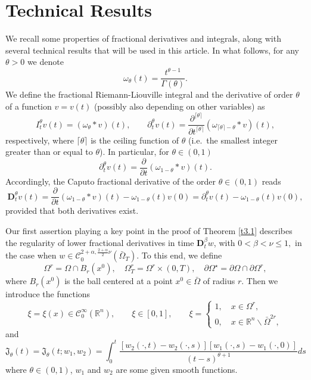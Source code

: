 \documentclass[reqno]{amsart}
\def\R {\mathbb{R}}
\def\C {\mathcal{C}}
\theoremstyle{definition}
\numberwithin{equation}{section}
\begin{document}
\section{Technical Results}
\label{s4}

\noindent
We recall some properties of fractional derivatives and integrals,
along with several technical results that will be used in this article.
In what follows, for any $\theta>0$ we denote
\begin{equation*}\label{4.1}
\omega_{\theta}(t)=\frac{t^{\theta-1}}{\Gamma(\theta)}.
\end{equation*}
We define the fractional Riemann-Liouville integral and the derivative of order $\theta$ of a function $v=v(t)$ (possibly also depending on other variables) as
\begin{equation*}
I_{t}^{\theta}v(t)=(\omega_{\theta}* v)(t),\qquad
\partial _{t}^{\theta}v(t)=\frac{\partial^{\lceil\theta\rceil}}{\partial
t^{\lceil\theta\rceil}}(\omega_{\lceil\theta\rceil-\theta}*
v)(t),
\end{equation*}
respectively, where $\lceil\theta\rceil$ is the ceiling function of $\theta$
(i.e.\ the smallest integer greater than or equal to $\theta$).
In
particular, for $\theta\in(0,1)$
\begin{equation*}
\partial _{t}^{\theta}v(t)=\frac{\partial}{\partial
t}(\omega_{1-\theta}* v)(t).
\end{equation*}
Accordingly,  the Caputo fractional derivative of the
order $\theta\in(0,1)$ reads
$$
\mathbf{D}_{t}^{\theta}v(t)=\frac{\partial}{\partial
t}(\omega_{1-\theta}* v)(t)-\omega_{1-\theta}(t)v(0)
=\partial _{t}^{\theta}v(t)-\omega_{1-\theta}(t)v(0),
$$
provided that both derivatives exist.

Our first assertion playing a key point in the proof of Theorem \ref{t3.1} describes the regularity of lower fractional derivatives in time $\mathbf{D}_{t}^{\beta}w$,
with $0<\beta<\nu\leq 1,$ in the case when $w\in\C_{0}^{2+\alpha,\frac{2+\alpha}{2}\nu}(\bar{\Omega}_{T})$. To this end,
we define
\[
\Omega^{r}=\Omega\cap B_{r}(x^{0}),\quad \Omega_{T}^{r}=\Omega^{r}\times(0,T),\quad \partial\Omega^{\star}=\partial\Omega\cap\partial\Omega^{r},
\]
where $B_{r}(x^{0})$ is the
ball centered at a point $x^{0}\in\bar{\Omega}$ of radius $r$.
Then we introduce the functions
\[
\xi=\xi(x)\in\C_{0}^{\infty}(\R^{n}),\qquad \xi\in[0,1],\qquad
\xi=\begin{cases}
1,\quad x\in\Omega^{r},\\
0,\quad x\in\R^{n}\backslash \bar{\Omega}^{2r},
\end{cases}
\]
and
\begin{equation*}\label{4.3*}
\mathfrak{J}_{\theta}(t)=\mathfrak{J}_{\theta}(t;w_1,w_2)=
\int_{0}^{t}\frac{[w_{2}(\cdot,t)-w_{2}(\cdot,s)][w_1(\cdot,s)-w_1(\cdot,0)]}{(t-s)^{\theta+1}}ds
\end{equation*}
where $\theta\in(0,1)$, $w_1$ and $w_2$ are some given smooth functions.
\end{document}
